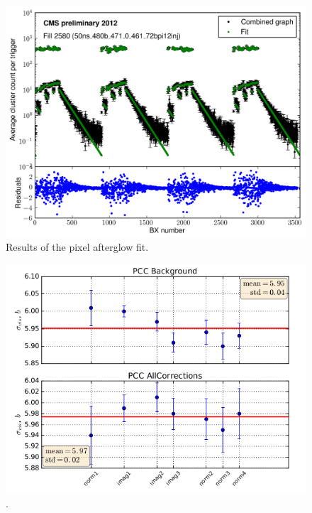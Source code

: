 \begin{figure}[H]
  \centering
  \includegraphics[width=0.5\columnwidth]{./afterglow.png}
  \caption{Results of the pixel afterglow fit.}
  \label{fig:LHC}
\end{figure}

\begin{figure}[H]
  \centering
  \includegraphics[width=0.5\columnwidth]{./PCC_background.png}
  \caption{ \onehalfspacing \cite{}.}
  \label{fig:CMS}
\end{figure}


